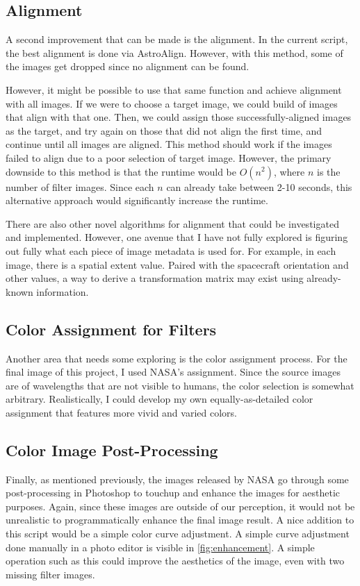 \documentclass[10pt,twocolumn,letterpaper]{article}
\begin{document}
\subsection{Alignment}

A second improvement that can be made is the alignment. In the current script, the best alignment is done via AstroAlign. However, with this method, some of the images get dropped since no alignment can be found.

However, it might be possible to use that same function and achieve alignment with all images. If we were to choose a target image, we could build of images that align with that one. Then, we could assign those successfully-aligned images as the target, and try again on those that did not align the first time, and continue until all images are aligned. 
This method should work if the images failed to align due to a poor selection of target image. However, the primary downside to this method is that the runtime would be $O(n^2)$, where $n$ is the number of filter images. Since each $n$ can already take between 2-10 seconds, this alternative approach would significantly increase the runtime.

There are also other novel algorithms for alignment that could be investigated and implemented. However, one avenue that I have not fully explored is figuring out fully what each piece of image metadata is used for. For example, in each image, there is a spatial extent value. Paired with the spacecraft orientation and other values, a way to derive a transformation matrix may exist using already-known information.

\subsection{Color Assignment for Filters}

Another area that needs some exploring is the color assignment process. For the final image of this project, I used NASA's assignment. Since the source images are of wavelengths that are not visible to humans, the color selection is somewhat arbitrary. Realistically, I could develop my own equally-as-detailed color assignment that features more vivid and varied colors.

\subsection{Color Image Post-Processing}

Finally, as mentioned previously, the images released by NASA go through some post-processing in Photoshop to touchup and enhance the images for aesthetic purposes. Again, since these images are outside of our perception, it would not be unrealistic to programmatically enhance the final image result. 
A nice addition to this script would be a simple color curve adjustment. A simple curve adjustment done manually in a photo editor is visible in \cref{fig:enhancement}. A simple operation such as this could improve the aesthetics of the image, even with two missing filter images.
\end{document}
